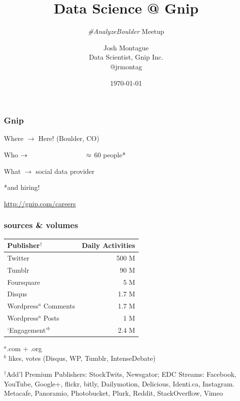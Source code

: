 \documentclass{beamer}
\title{Data Science @ Gnip }
\subtitle{\emph{\#AnalyzeBoulder} Meetup}
\author{Josh Montague\texorpdfstring{\\ Data Scientist, Gnip Inc. \\ @jrmontag}{}}
\date{\today}
\begin{document}
\begin{frame}
\titlepage
\end{frame}


\begin{frame} \frametitle{Gnip}

\vspace{0.2in}

\LARGE{Where $\to$  \hspace{0.55in} Here! (Boulder, CO) }

\vspace{0.2in}

\LARGE{Who $\to  \hspace{1.2in} \approx$ 60 people* } 

\vspace{0.2in}

\LARGE{What $\to$ \hspace{0.7in} social data provider}

\vspace{0.7in}

{\hfill \Large{*and hiring!}} 

{\hfill \normalsize\url{http://gnip.com/careers}}
\end{frame}


\begin{frame} \frametitle{sources \& volumes}

\vspace{0.1in}

\begin{table}
	\begin{tabular}{l|r}
		\hline
		{Publisher$^\dagger$}			&   	{Daily Activities} \\
		\hline 
		Twitter      					&	500 M \\
		Tumblr      					&	90 M \\
		Foursquare      					&	5 M \\
		Disqus       					&	1.7 M \\
		Wordpress$^{a}$ Comments 		&	1.7 M \\
		Wordpress$^{a}$ Posts 			&	1 M \\
		`Engagement'$^{b}$ 			&	2.4 M \\
		\hline
	\end{tabular}
\end{table}
$^a$.com + .org \\
$^b$ likes, votes (Disqus, WP, Tumblr, IntenseDebate) \\

\vspace{0.2in}

{\tiny
$^\dagger$Add'l Premium Publishers: StockTwits, Newsgator; EDC Streams: Facebook, YouTube, Google+, flickr, bitly, Dailymotion, Delicious, Identi.ca, Instagram. Metacafe, Panoramio, Photobucket, Plurk, Reddit, StackOverflow, Vimeo
}
\end{frame}
\end{document}
